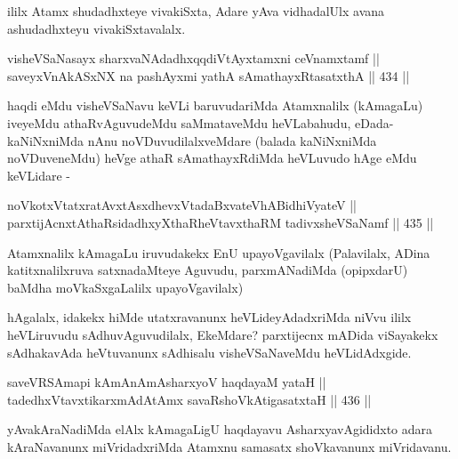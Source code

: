 \begin{artha}
ililx Atamx shudadhxteye vivakiSxta, Adare yAva vidhadalUlx avana ashudadhxteyu vivakiSxtavalalx.
\end{artha}


\begin{shl}
visheVSaNasayx sharxvaNAdadhxqqdiVtAyxtamxni ceVnamxtamf || \\
saveyxVnAkASxNX na pashAyxmi yathA sAmathayxRtasatxthA \hfill || 434 ||  
\end{shl}

\begin{artha}
haqdi eMdu visheVSaNavu keVLi baruvudariMda Atamxnalilx
(kAmagaLu) iveyeMdu athaRvAguvudeMdu saMmataveMdu heVLabahudu,
eDada-kaNiNxniMda nAnu noVDuvudilalxveMdare (balada kaNiNxniMda
noVDuveneMdu) heVge athaR sAmathayxRdiMda heVLuvudo hAge eMdu
keVLidare -
\end{artha}


\begin{shl}
noVkotxVtatxratAvxtAsxdhevxVtadaBxvateVhABidhiVyateV || \\
parxtijAcnxtAthaRsidadhxyXthaRheVtavxthaRM tadivxsheVSaNamf \hfill || 435 ||  
\end{shl}

\begin{artha}
Atamxnalilx kAmagaLu iruvudakekx EnU upayoVgavilalx (Palavilalx, ADina
katitxnalilxruva satxnadaMteye Aguvudu, parxmANadiMda (opipxdarU)
baMdha moVkaSxgaLalilx upayoVgavilalx)
\end{artha}

\begin{artha}
hAgalalx, idakekx hiMde utatxravanunx heVLideyAdadxriMda niVvu ililx
heVLiruvudu sAdhuvAguvudilalx, EkeMdare? parxtijecnx
mADida viSayakekx sAdhakavAda heVtuvanunx sAdhisalu visheVSaNaveMdu
heVLidAdxgide.
\end{artha}


\begin{shl}
saveVRSAmapi kAmAnAmAsharxyoV haqdayaM yataH || \\
tadedhxVtavxtikarxmAdAtAmx savaRshoVkAtigasatxtaH \hfill || 436 ||  
\end{shl}

\begin{artha}
yAvakAraNadiMda elAlx kAmagaLigU haqdayavu AsharxyavAgididxto adara
kAraNavanunx miVridadxriMda Atamxnu samasatx shoVkavanunx miVridavanu.
\end{artha}

